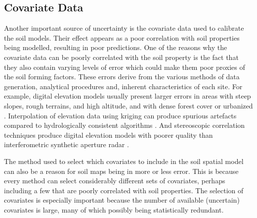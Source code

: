 \subsection{Covariate Data}

Another important source of uncertainty is the covariate data used to calibrate the soil models. Their 
effect appears as a poor correlation with soil properties being modelled, resulting in poor predictions.
One of the reasons why the covariate data can be poorly correlated with the soil property is the fact
that they also contain varying levels of error \cite{HeuvelinkEtAl1989} which could make them 
poor proxies of the soil forming factors. These errors derive from the various 
methods of data generation, analytical procedures and, inherent characteristics of
each site. For example, digital elevation models usually present larger errors in areas with steep
slopes, rough terrains, and high altitude, and with dense forest cover or urbanized
\cite{Florinsky1998, Toutin2000, FisherEtAl2006}. Interpolation of elevation data using kriging
can produce spurious artefacts \cite{HenglEtAl2009} compared to hydrologically consistent
algorithms \cite{Hutchinson1989}. And stereoscopic correlation techniques produce digital elevation
models with poorer quality than interferometric synthetic aperture radar \cite{HirtEtAl2010}.

The method used to select which covariates to include in the soil spatial model can also be a reason for
soil maps being in more or less error. This is because every method can select considerably different 
sets of covariates, perhaps including a few that are poorly correlated with soil properties. The selection
of covariates is especially important because the number of available (uncertain) covariates is large, 
many of which possibly being statistically redundant. 


